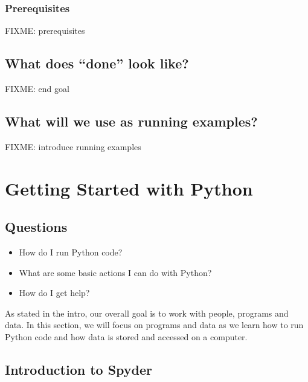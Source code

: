 \documentclass[]{Nemilov}
\providecommand{\tightlist}{%
  \setlength{\itemsep}{0pt}\setlength{\parskip}{0pt}}
\begin{document}
\hypertarget{prerequisites}{%
\subsection{Prerequisites}\label{prerequisites}}

FIXME: prerequisites

\hypertarget{py-intro-goals}{%
\section{What does ``done'' look like?}\label{py-intro-goals}}

FIXME: end goal

\hypertarget{py-intro-example}{%
\section{What will we use as running examples?}\label{py-intro-example}}

FIXME: introduce running examples

\hypertarget{py-getting-started}{%
\chapter{Getting Started with Python}\label{py-getting-started}}

\hypertarget{py-getting-started-questions}{%
\section{Questions}\label{py-getting-started-questions}}

\begin{itemize}
\tightlist
\item
  How do I run Python code?
\item
  What are some basic actions I can do with Python?
\item
  How do I get help?
\end{itemize}

As stated in the intro, our overall goal is to work with people, programs
and data. In this section, we will focus on programs and data as we learn
how to run Python code and
how data is stored and accessed on a computer.

\hypertarget{py-getting-started-spyder}{%
\section{Introduction to Spyder}\label{py-getting-started-spyder}}
\end{document}
